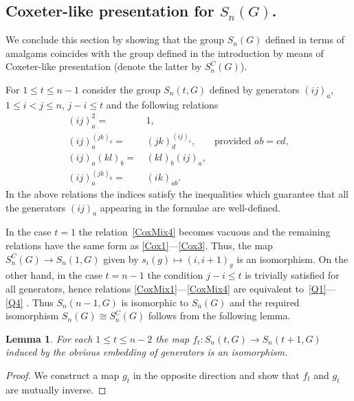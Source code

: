 \documentclass[oneside, 10pt]{amsart}
\theoremstyle{plain}
\numberwithin{equation}{section}
\newtheorem{lemma}{Lemma}
\numberwithin{lemma}{section}
\theoremstyle{remark}
\theoremstyle{definition}
\begin{document}
\subsection{Coxeter-like presentation for $S_n(G)$.}
We conclude this section by showing that the group $S_n(G)$ defined in terms of amalgams
 coincides with the group defined in the introduction by means of Coxeter-like presentation (denote the latter by $S_n^{C}(G)$).

For $1\leq t\leq n-1$ consider the group $S_n(t, G)$ defined by generators $(ij)_a$, $1\leq i<j \leq n$, $j-i\leq t$ and the following relations
\begin{align}
(ij)_a^2                      = &\, 1,                   &               \label{CoxMix1} \\
(ij)_a^{(jk)_b}               = &\, (jk)_{d}^{(ij)_{c}}, & \text{provided } ab = cd,      \label{CoxMix2} \\
(ij)_a (kl)_b                 = &\, (kl)_b (ij)_a,       &               \label{CoxMix3} \\
(ij)_a ^ {(jk)_b}             = &\, (ik)_{ab}.           &               \label{CoxMix4}
\end{align}
In the above relations the indices satisfy the inequalities which guarantee that all the generators $(ij)_a$ appearing in the formulae are well-defined.

In the case $t=1$ the relation~\eqref{CoxMix4} becomes vacuous and the remaining relations have the same form as \eqref{Cox1}---\eqref{Cox3}.
Thus, the map $S_n^C(G) \to S_n(1, G)$ given by $s_i(g)\mapsto (i,i+1)_g$ is an isomorphism. 
On the other hand, in the case $t=n-1$ the condition $j-i\leq t$ is trivially satisfied for all generators,
 hence relations \eqref{CoxMix1}---\eqref{CoxMix4} are equivalent to~\eqref{Q1}---\eqref{Q4} . Thus $S_n(n-1,G)$ is isomorphic to $S_n(G)$ and the required 
isomorphism $S_n(G) \cong S_n^C(G)$ follows from the following lemma.
 
\begin{lemma} \label{lem:coxeter-amalgam}
For each $1 \leq t \leq n-2$ the map $f_t \colon S_n(t, G)\to S_n(t+1, G)$ induced by the obvious embedding of generators is an isomorphism.
\end{lemma}
\begin{proof}
We construct a map $g_t$ in the opposite direction and show that $f_t$ and $g_t$ are mutually inverse.

\end{proof} 
\end{document}
